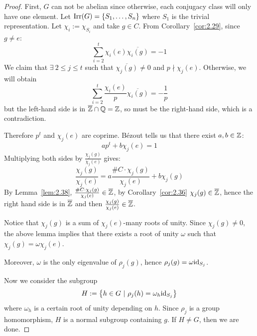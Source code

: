 \documentclass[twoside = false,	%
		headsepline,		%
		parskip = true,
		]{scrbook}						%
\begin{document}
    \begin{proof}
        First, $G$ can not be abelian since otherwise, each conjugacy class will only have one element.
        Let $\mathrm{Irr}(G) = \{S_1,\dots,S_n\}$ where $S_1$ is the trivial representation. Let $\chi_i := \chi_{S_i}$ and take $g \in C$.
        From Corollary~\ref{cor:2.29}, since $g \neq e$:
        \begin{equation*}
            \sum_{i=2}^t \chi_i(e) \overline{\chi_i(g)} = -1
        \end{equation*}
        We claim that $\exists \ 2 \leq j \leq t$ such that $\overline{\chi_j(g)} \neq 0$ and $p \nmid \chi_j(e)$. Otherwise, we will obtain
        \begin{equation*}
            \sum_{i=2}^t \frac{\chi_i(e)}{p} \overline{\chi_i(g)} = -\frac{1}{p}
        \end{equation*}
        but the left-hand side is in $\overline{\mathbb Z} \cap \mathbb Q = \mathbb Z$, so must be the right-hand side, which is a contradiction.

        Therefore $p^t$ and $\chi_j(e)$ are coprime. Bézout tells us that there exist $a,b \in \mathbb Z$:
        \begin{equation*}
            a p^t + b \chi_j(e) = 1
        \end{equation*}
        Multiplying both sides by $\frac{\chi_j(g)}{\chi_j(e)}$ gives:
        \begin{equation*}
            \frac{\chi_j(g)}{\chi_j(e)} = a \frac{\#C \cdot \chi_j(g)}{\chi_j(e)} + b \chi_j(g)
        \end{equation*}
        By Lemma~\ref{lem:2.38}, $\frac{\#C \cdot \chi_j(g)}{\chi_j(e)} \in \overline{\mathbb Z}$, by Corollary~\ref{cor:2.36} $\chi_j(g) \in \overline{\mathbb Z}$,
        hence the right hand side is in $\overline{\mathbb Z}$ and then $\frac{\chi_j(g)}{\chi_j(e)} \in \overline{\mathbb Z}$.

        Notice that $\chi_j(g)$ is a sum of $\chi_j(e)$-many roots of unity.
        Since $\chi_j(g) \neq 0$, the above lemma implies that there exists a root of unity $\omega$ such that $\chi_j(g) = \omega \chi_j(e)$.
        
        Moreover, $\omega$ is the only eigenvalue of $\rho_j(g)$, hence $\rho_j(g) = \omega \mathrm{id}_{S_j}$.

        Now we consider the subgroup
        \begin{equation*}
            H:= \left\{ h \in G \ | \ \rho_j(h) = \omega_h \mathrm{id}_{S_j}\right\}
        \end{equation*}
        where $\omega_h$ is a certain root of unity depending on $h$. Since $\rho_j$ is a group homomorphism,
        $H$ is a normal subgroup containing $g$. If $H \neq G$, then we are done.


\end{proof}
\end{document}
